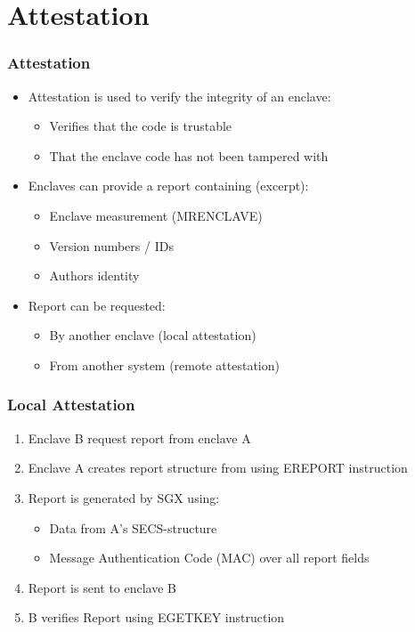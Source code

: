 \section{Attestation}
\begin{frame}
    \frametitle{Attestation}
    \begin{itemize}[<+->]
        \item Attestation is used to verify the integrity of an enclave:
        \begin{itemize}[<+->]
            \item Verifies that the code is trustable
            \item That the enclave code has not been tampered with
        \end{itemize}
        \item Enclaves can provide a report containing (excerpt):
        \begin{itemize}
            \item Enclave measurement (MRENCLAVE)
            \item Version numbers / IDs
            \item Authors identity
        \end{itemize}
        \item Report can be requested:
        \begin{itemize}
            \item By another enclave (local attestation)
            \item From another system (remote attestation)
        \end{itemize}
    \end{itemize}
\end{frame}

\begin{frame}
    \frametitle{Local Attestation}
    \begin{enumerate}[<+->]
        \item Enclave B request report from enclave A
        \item Enclave A creates report structure from using EREPORT instruction
        \item Report is generated by SGX using:
        \begin{itemize}
            \item Data from A's SECS-structure
            \item Message Authentication Code (MAC) over all report fields
        \end{itemize}
        \item Report is sent to enclave B
        \item B verifies Report using EGETKEY instruction
    \end{enumerate}
\end{frame}

